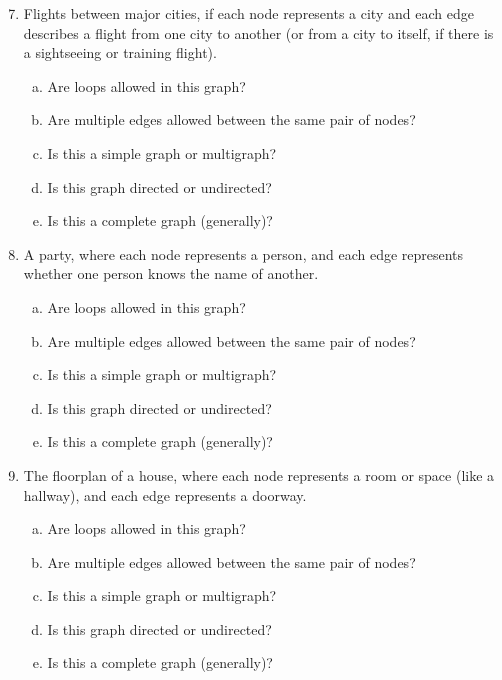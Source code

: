 \begin{enumerate}
\setcounter{enumi}{6}

\item Flights between major cities, if each node represents a city and each edge describes a flight from one city to another (or from a city to itself, if there is a sightseeing or training flight).
\begin{enumerate}[(a)]
\item Are loops allowed in this graph? 
\item Are multiple edges allowed between the same pair of nodes? 
\item Is this a simple graph or multigraph? 
\item Is this graph directed or undirected? 
\item Is this a complete graph (generally)? 
\end{enumerate}

\item A party, where each node represents a person, and each edge represents whether one person knows the name of another.
\begin{enumerate}[(a)]
\item Are loops allowed in this graph? 
\item Are multiple edges allowed between the same pair of nodes? 
\item Is this a simple graph or multigraph? 
\item Is this graph directed or undirected? 
\item Is this a complete graph (generally)? 
\end{enumerate}

\item The floorplan of a house, where each node represents a room or space (like a hallway), and each edge represents a doorway.
\begin{enumerate}[(a)]
\item Are loops allowed in this graph? 
\item Are multiple edges allowed between the same pair of nodes? 
\item Is this a simple graph or multigraph? 
\item Is this graph directed or undirected? 
\item Is this a complete graph (generally)? 
\end{enumerate}


\end{enumerate}
